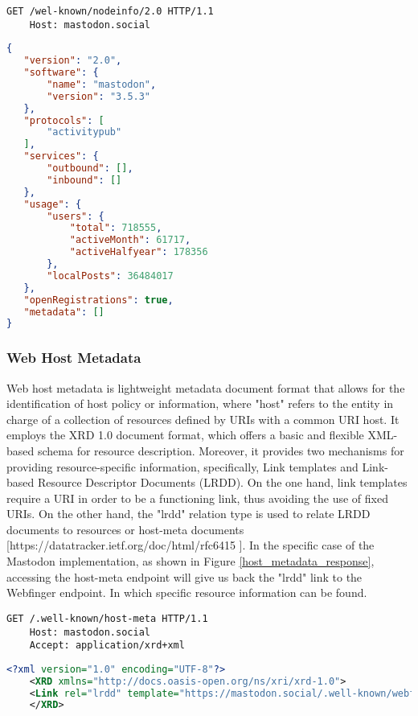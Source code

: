 \begin{lstlisting}[language=HTTP, caption=NodeInfo request]
    GET /wel-known/nodeinfo/2.0 HTTP/1.1
    Host: mastodon.social
\end{lstlisting}

\begin{lstlisting}[language=Json, caption=NodeInfo response for mastodon.social, label=NodeInfo response for mastodon.social, float=H]
{
   "version": "2.0",
   "software": {
       "name": "mastodon",
       "version": "3.5.3"
   },
   "protocols": [
       "activitypub"
   ],
   "services": {
       "outbound": [],
       "inbound": []
   },
   "usage": {
       "users": {
           "total": 718555,
           "activeMonth": 61717,
           "activeHalfyear": 178356
       },
       "localPosts": 36484017
   },
   "openRegistrations": true,
   "metadata": []
}
\end{lstlisting}


\subsubsection{Web Host Metadata}
    Web host metadata is lightweight metadata document format that allows for the identification of host policy or information, where "host" refers to the entity in charge of a collection of resources defined by URIs with a common URI host. It employs the XRD 1.0 document format, which offers a basic and flexible XML-based schema for resource description. Moreover,  it provides two mechanisms for providing resource-specific information, specifically,  Link templates and Link-based Resource Descriptor Documents (LRDD). On the one hand, link templates require a URI in order to be a functioning link, thus avoiding the use of fixed URIs. On the other hand, the "lrdd" relation type is used to relate LRDD documents to resources or host-meta documents [https://datatracker.ietf.org/doc/html/rfc6415 ]. In the specific case of the Mastodon implementation, as shown in Figure \ref{host_metadata_response}, accessing the host-meta endpoint will give us back the "lrdd" link to the Webfinger endpoint. In which specific resource information can be found. 

\begin{lstlisting}[language=HTTP, caption=Host Medata request, label="Host Metadata request]
    GET /.well-known/host-meta HTTP/1.1
    Host: mastodon.social
    Accept: application/xrd+xml
\end{lstlisting}

\begin{lstlisting}[language=XML, caption=Host metadata response from mastodon.social, label=host_metadata_response]
    <?xml version="1.0" encoding="UTF-8"?>
    <XRD xmlns="http://docs.oasis-open.org/ns/xri/xrd-1.0">
    <Link rel="lrdd" template="https://mastodon.social/.well-known/webfinger?resource={uri}"/>
    </XRD>
\end{lstlisting}

